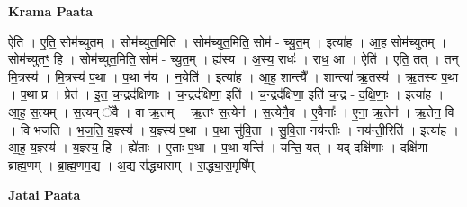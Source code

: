 \documentclass[17pt]{extarticle}
\begin{document}
\textbf{Krama Paata} \newline

ऐति॑ । ए॒ति॒ सोम॑च्युतम् । सोम॑च्युत॒मिति॑ । सोम॑च्युत॒मिति॒ सोम॑ - च्यु॒त॒म् । इत्या॑ह । आ॒ह॒ सोम॑च्युतम् । सोम॑च्युतꣳ॒॒ हि । सोम॑च्युत॒मिति॒ सोम॑ - च्यु॒त॒म् । ह्य॑स्य । अ॒स्य॒ राधः॑ । राध॒ आ । ऐति॑ । एति॒ तत् । तन् मि॒त्रस्य॑ । मि॒त्रस्य॑ प॒था । प॒था न॑य । न॒येति॑ । इत्या॑ह । आ॒ह॒ शान्त्यै᳚ । शान्त्या॑ ऋ॒तस्य॑ । ऋ॒तस्य॑ प॒था । प॒था प्र । प्रेत॑ । इ॒त॒ च॒न्द्रद॑क्षिणाः । च॒न्द्रद॑क्षिणा॒ इति॑ । च॒न्द्रद॑क्षिणा॒ इति॑ च॒न्द्र - द॒क्षि॒णाः॒ । इत्या॑ह । आ॒ह॒ स॒त्यम् । स॒त्यम् ॅवै । वा ऋ॒तम् । ऋ॒तꣳ स॒त्येन॑ । स॒त्येनै॒व । ए॒वैनाः᳚ । ए॒ना॒ ऋ॒तेन॑ । ऋ॒तेन॒ वि । वि भ॑जति । भ॒ज॒ति॒ य॒ज्ञ्स्य॑ । य॒ज्ञ्स्य॑ प॒था । प॒था सु॑वि॒ता । सु॒वि॒ता नय॑न्तीः । नय॑न्ती॒रिति॑ । इत्या॑ह । आ॒ह॒ य॒ज्ञ्स्य॑ । य॒ज्ञ्स्य॒ हि । ह्ये॑ताः । ए॒ताः प॒था । प॒था यन्ति॑ । यन्ति॒ यत् । यद् दक्षि॑णाः । दक्षि॑णा ब्राह्म॒णम् । ब्रा॒ह्म॒णम॒द्य । अ॒द्य रा᳚द्ध्यासम् । रा॒द्ध्या॒स॒मृषि᳚म् \newline

\textbf{Jatai Paata} \newline
\end{document}
